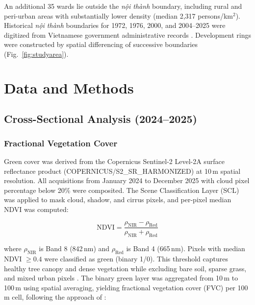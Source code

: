 \documentclass[preprint,12pt]{elsarticle}
\begin{document}
An additional 35 wards lie outside the \textit{nội thành} boundary, including rural and peri-urban areas with substantially lower density (median 2,317 persons/km$^2$). Historical \textit{nội thành} boundaries for 1972, 1976, 2000, and 2004--2025 were digitized from Vietnamese government administrative records \citep{vngo2004}. Development rings were constructed by spatial differencing of successive boundaries (Fig.~\ref{fig:studyarea}).

\section{Data and Methods}
\label{sec:methods}

\subsection{Cross-Sectional Analysis (2024--2025)}

\subsubsection{Fractional Vegetation Cover}

Green cover was derived from the Copernicus Sentinel-2 Level-2A surface reflectance product (COPERNICUS/S2\_SR\_HARMONIZED) at 10\,m spatial resolution. All acquisitions from January 2024 to December 2025 with cloud pixel percentage below 20\% were composited. The Scene Classification Layer (SCL) was applied to mask cloud, shadow, and cirrus pixels, and per-pixel median NDVI was computed:

\begin{equation}
    \text{NDVI} = \frac{\rho_{\text{NIR}} - \rho_{\text{Red}}}{\rho_{\text{NIR}} + \rho_{\text{Red}}}
\end{equation}

\noindent where $\rho_{\text{NIR}}$ is Band 8 (842\,nm) and $\rho_{\text{Red}}$ is Band 4 (665\,nm). Pixels with median NDVI $\geq 0.4$ were classified as green (binary 1/0). This threshold captures healthy tree canopy and dense vegetation while excluding bare soil, sparse grass, and mixed urban pixels \citep{gandhi2015}. The binary green layer was aggregated from 10\,m to 100\,m using spatial averaging, yielding fractional vegetation cover (FVC) per 100\,m cell, following the approach of \citet{carlson1997}:
\end{document}
